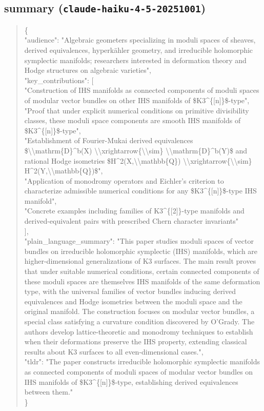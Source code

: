 \documentclass[11pt]{article}
\begin{document}
\subsection*{summary (\texttt{claude-haiku-4-5-20251001})}
\begin{quote}\small\ttfamily\raggedright
\{\\
  "audience": "Algebraic geometers specializing in moduli spaces of sheaves, derived equivalences, hyperkähler geometry, and irreducible holomorphic symplectic manifolds; researchers interested in deformation theory and Hodge structures on algebraic varieties",\\
  "key\_contributions": [\\
    "Construction of IHS manifolds as connected components of moduli spaces of modular vector bundles on other IHS manifolds of \$K3\^{}\{[n]\}\$-type",\\
    "Proof that under explicit numerical conditions on primitive divisibility classes, these moduli space components are smooth IHS manifolds of \$K3\^{}\{[n]\}\$-type",\\
    "Establishment of Fourier-Mukai derived equivalences \$\textbackslash{}\textbackslash{}mathrm\{D\}\^{}b(X) \textbackslash{}\textbackslash{}xrightarrow\{\textbackslash{}\textbackslash{}sim\} \textbackslash{}\textbackslash{}mathrm\{D\}\^{}b(Y)\$ and rational Hodge isometries \$H\^{}2(X,\textbackslash{}\textbackslash{}mathbb\{Q\}) \textbackslash{}\textbackslash{}xrightarrow\{\textbackslash{}\textbackslash{}sim\} H\^{}2(Y,\textbackslash{}\textbackslash{}mathbb\{Q\})\$",\\
    "Application of monodromy operators and Eichler's criterion to characterize admissible numerical conditions for any \$K3\^{}\{[n]\}\$-type IHS manifold",\\
    "Concrete examples including families of K3\^{}\{[2]\}-type manifolds and derived-equivalent pairs with prescribed Chern character invariants"\\
  ],\\
  "plain\_language\_summary": "This paper studies moduli spaces of vector bundles on irreducible holomorphic symplectic (IHS) manifolds, which are higher-dimensional generalizations of K3 surfaces. The main result proves that under suitable numerical conditions, certain connected components of these moduli spaces are themselves IHS manifolds of the same deformation type, with the universal families of vector bundles inducing derived equivalences and Hodge isometries between the moduli space and the original manifold. The construction focuses on modular vector bundles, a special class satisfying a curvature condition discovered by O'Grady. The authors develop lattice-theoretic and monodromy techniques to establish when their deformations preserve the IHS property, extending classical results about K3 surfaces to all even-dimensional cases.",\\
  "tldr": "The paper constructs irreducible holomorphic symplectic manifolds as connected components of moduli spaces of modular vector bundles on IHS manifolds of \$K3\^{}\{[n]\}\$-type, establishing derived equivalences between them."\\
\}\\
\end{quote}
\end{document}
